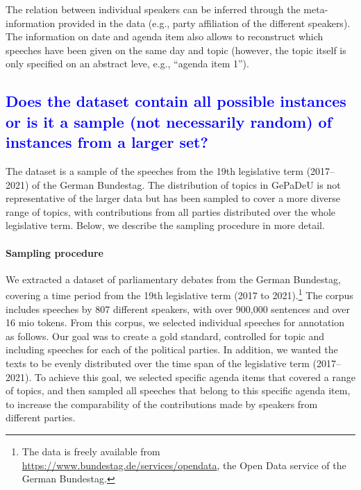 \documentclass[letterpaper, 10 pt, conference]{ieeeconf}  %
\newcommand{\gepadeu}{{\sc GePaDeU}}
\begin{document}
The relation between individual speakers can be inferred through the meta-information provided in the data (e.g., party affiliation of the different speakers). The information on date and agenda item also allows to reconstruct which speeches have been given on the same day and topic (however, the topic itself is only specified on an abstract leve, e.g., ``agenda item 1'').


\textcolor{blue}{\subsection{Does the dataset contain all possible instances or is it a sample (not necessarily random) of instances from a larger set?}}
\label{sub:sampling}

The dataset is a sample of the speeches from the 19th legislative term (2017--2021) of the German Bundestag. 
The distribution of topics in \gepadeu{} is not representative of the larger data but has been sampled to cover a more diverse range of topics, with contributions from all parties distributed over the whole legislative term. Below, we describe the sampling procedure in more detail.
 
\paragraph{Sampling procedure}
We extracted a dataset of parliamentary debates from the German Bundestag, covering a time period from the 19th legislative term (2017 to 2021).\footnote{The data is freely available from \url{https://www.bundestag.de/services/opendata}, the Open Data service of the German Bundestag.}
The corpus includes speeches by 807 different speakers, with over 900,000
sentences and over 16 mio tokens. 
From this corpus, we selected individual speeches for annotation as follows.
Our goal was to create a gold standard, controlled for topic and including speeches for each of the political parties. In addition, we wanted the texts to be evenly distributed over the time span of the legislative term (2017--2021). 
To achieve this goal, we selected specific agenda items that covered a range of topics, 
and then sampled all speeches that belong to this specific agenda item, to increase the comparability of the contributions made by speakers from different parties.
\end{document}
